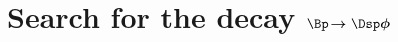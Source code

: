 \chapter[Search for the decay $\Bp\!\to\Dsp\phi$]{Search for the decay $\boldsymbol{\Bp\!\to\Dsp\phi}$}
\label{ch:dsphi}






%
%
%
%
%
%
%
%
%
%
%
%
%

